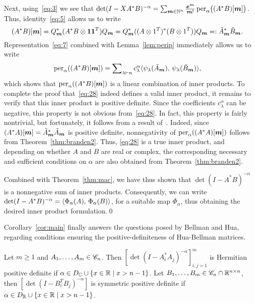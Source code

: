 \documentclass[11pt]{article}
\begin{document}
Next, using~\eqref{eq:3} we see that
$\det(I-XA^*B)^{-\alpha} = \sum_{\bm{m} \in \mathbb{N}^n}\frac{\bm{x}^{\bm{m}}}{\bm{m}!}\operatorname{per}_\alpha\bigl( (A^*B)[\bm{m}]\bigr)$. Thus, identity~\eqref{eq:5} allows us to write
\begin{equation}
  \label{eq:7}
  (A^*B)[\bm{m}] = Q_{\bm{m}}^*( A^*B \otimes \bm{11}^T)Q_{\bm{m}} = Q_{\bm{m}}^*((A\otimes 1^T)^*(B\otimes 1^T))Q_{\bm{m}} =: \tilde{A}_{\bm{m}}^*\tilde{B}_{\bm{m}}.
\end{equation}
Representation~\eqref{eq:7} combined with Lemma~\ref{lem:perip} immediately allows us to write
\begin{equation}
  \label{eq:28}
  \operatorname{per}_\alpha((A^*B)[\bm{m}]) = \sum\nolimits_{\lambda \vdash n} c_\lambda^\alpha\langle {\psi_\lambda(\tilde{A}_{\bm{m}})},\, {\psi_\lambda(\tilde{B}_{\bm{m}})} \rangle,
\end{equation}
which shows that $\operatorname{per}_\alpha( (A^*B)[\bm{m}])$ is a linear combination of inner products. To complete the proof that~\eqref{eq:28} indeed defines a valid inner product, it remains to verify that this inner product is positive definite. Since the coefficients $c_\lambda^\alpha$ can be negative, this property is not obvious from~\eqref{eq:28}.
In fact, this property is fairly nontrivial, but fortunately, it follows from a result of~\citet{branden2012}. Indeed, since $(A^*A)[\bm{m}]=\tilde{A}_{\bm{m}}^*\tilde{A}_{\bm{m}}$ is positive definite, nonnegativity of $\operatorname{per}_\alpha((A^*A)[\bm{m}])$ follows from Theorem~\ref{thm:branden2}. Thus, \eqref{eq:28} is a true inner product, and depending on whether $A$ and $B$ are real or complex, the corresponding necessary and sufficient conditions on $\alpha$ are also obtained from Theorem~\ref{thm:branden2}.

Combined with Theorem~\ref{thm:mac}, we have thus shown that $\det(I-A^*B)^{-\alpha}$ is a nonnegative sum of inner products. Consequently, we can write $\det(I-A^*B)^{-\alpha}=\langle {\Phi_\alpha(A)},\, {\Phi_\alpha(B)} \rangle$, for a suitable map $\Phi_\alpha$, thus obtaining the desired inner product formulation.\qed

Corollary~\ref{cor:main} finally answers the questions posed by Bellman and Hua, regarding conditions ensuring the positive-definiteness of Hua-Bellman matrices.
\begin{cor}
  \label{cor:main}
  Let $m \ge 1$ and $A_1,\ldots,A_m \in \mathscr{C}_n$. Then $[\det(I-A_i^*A_j)^{-\alpha}]_{i,j=1}^m$ is Hermitian positive definite if $\alpha \in D_{\mathbb{C}} \cup \{x \in \mathbb{R} \mid x > n-1\}$. Let $B_1,\ldots,B_m \in \mathscr{C}_n \cap \mathbb{R}^{n\times n}$, then $[\det(I-B_i^TB_j)^{-\alpha}]$ is symmetric positive definite if $\alpha \in D_{\mathbb{R}} \cup \{x \in \mathbb{R} \mid x > n-1\}$.
\end{cor}
\end{document}
